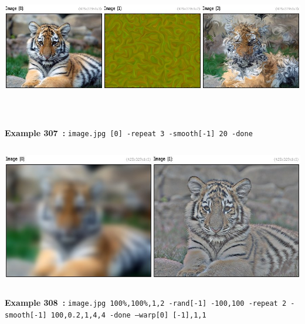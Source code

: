 \documentclass[a4paper,11pt,twoside]{book}
\begin{document}
\begin{center}\includegraphics[keepaspectratio=true,height=7cm,width=\textwidth]{img/gmic_def307.jpg}\\
{\footnotesize \textbf{Example 307~:} \texttt{image.jpg [0] -repeat 3 -smooth[-1] 20 -done}}
\\\includegraphics[keepaspectratio=true,height=7cm,width=\textwidth]{img/gmic_def308.jpg}\\
{\footnotesize \textbf{Example 308~:} \texttt{image.jpg 100\%,100\%,1,2 -rand[-1] -100,100 -repeat 2 -smooth[-1] 100,0.2,1,4,4 -done --warp[0] [-1],1,1}}
\end{center}
\end{document}
